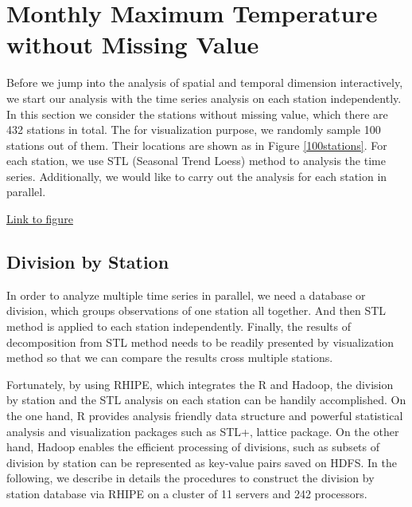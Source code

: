 \section{Monthly Maximum Temperature without Missing Value}

Before we jump into the analysis of spatial and temporal dimension interactively, 
we start our analysis with the time series analysis on each station independently.
In this section we consider the stations without missing value, which
there are 432 stations in total. The for visualization purpose, we randomly sample
100 stations out of them. Their locations are shown as in Figure 
\href{../plots/100stations.pdf}{\ref*{100stations}}. For each station, we use 
STL (Seasonal Trend Loess) method to analysis the time series. 
Additionally, we would like to carry out the analysis for each station in parallel. 

\begin{framed}
\begin{center}
  \href{../plots/100stations.pdf}{Link to figure}
  \label{100stations}
\end{center}
\end{framed} 

\subsection{Division by Station}
\label{sec:divibyStation}

In order to analyze multiple time series in parallel, we need a database or division,
which groups observations of one station all together. And then STL method is 
applied to each station independently. Finally, the results of decomposition from
STL method needs to be readily presented by visualization method so that we can
compare the results cross multiple stations. 

Fortunately, by using RHIPE, which integrates the R and Hadoop, the division by 
station and the STL analysis on each station can be handily accomplished.
On the one hand, R provides analysis friendly data structure and powerful 
statistical analysis and visualization packages such as STL+, lattice package.
On the other hand, Hadoop enables the efficient processing of divisions, such as
subsets of division by station can be represented as key-value pairs saved on 
HDFS. In the following, we describe in details the procedures to construct the 
division by station database via RHIPE on a cluster of 11 servers and 242 processors.

